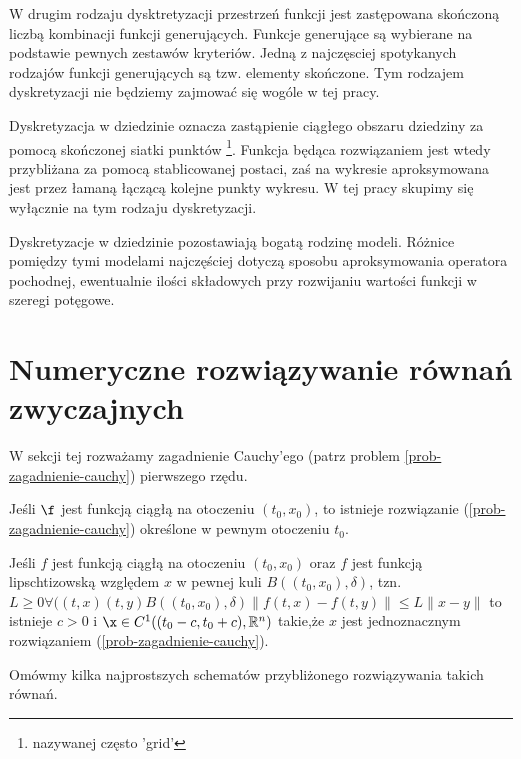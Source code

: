 \documentclass[12pt,a4paper]{report}
\begin{document}
W drugim rodzaju dysktretyzacji przestrzeń funkcji jest zastępowana skończoną liczbą kombinacji funkcji generujących. Funkcje generujące są wybierane na podstawie pewnych zestawów kryteriów. Jedną z najczęsciej spotykanych rodzajów funkcji generujących są tzw. elementy skończone. Tym rodzajem dyskretyzacji nie będziemy zajmować się wogóle w tej pracy.

Dyskretyzacja w dziedzinie oznacza zastąpienie ciągłego obszaru dziedziny za pomocą skończonej siatki punktów \footnote{nazywanej często 'grid'}. Funkcja będąca rozwiązaniem jest wtedy przybliżana za pomocą stablicowanej postaci, zaś na wykresie aproksymowana jest przez łamaną łączącą kolejne punkty wykresu. W tej pracy skupimy się wyłącznie na tym rodzaju dyskretyzacji. 

Dyskretyzacje w dziedzinie pozostawiają bogatą rodzinę modeli. Różnice pomiędzy tymi modelami najczęściej dotyczą sposobu aproksymowania operatora pochodnej, ewentualnie ilości składowych przy rozwijaniu wartości funkcji w szeregi potęgowe. 


\section{Numeryczne rozwiązywanie równań zwyczajnych}

W sekcji tej rozważamy zagadnienie Cauchy'ego (patrz problem \ref{prob-zagadnienie-cauchy}) pierwszego rzędu. 


\begin{theorem}[Peano]
Jeśli $\f$ jest funkcją ciągłą na otoczeniu $(t_{0},x_{0})$, to istnieje rozwiązanie (\ref{prob-zagadnienie-cauchy}) określone w pewnym otoczeniu $t_{0}$. 
\end{theorem}

\begin{theorem}
Jeśli $f$ jest funkcją ciągłą na otoczeniu $(t_{0},x_{0})$ oraz $f$ jest funkcją lipschtizowską względem $x$ w pewnej kuli $B((t_{0},x_{0}),\delta)$, tzn. 
\newline \exists $L\geq 0 \forall ((t,x)(t,y) B((t_{0},x_{0}),\delta)  \parallel f(t,x) - f(t,y) \parallel \leq L\parallel x-y \parallel $
\newline to istnieje $ c> 0 $ i $\x \in C^{1}((t_0 - c, t_0 + c ), \setR^{n}) $ takie,że $x$ jest jednoznacznym rozwiązaniem (\ref{prob-zagadnienie-cauchy}).
\end{theorem}


Omówmy kilka najprostszych schematów przybliżonego rozwiązywania takich równań.
\end{document}
